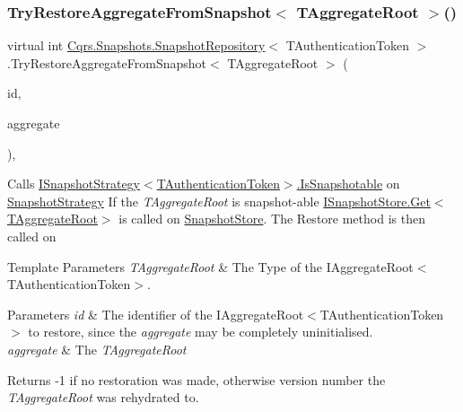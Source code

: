 \subsubsection{\texorpdfstring{Try\+Restore\+Aggregate\+From\+Snapshot$<$ T\+Aggregate\+Root $>$()}{TryRestoreAggregateFromSnapshot< TAggregateRoot >()}}
{\footnotesize\ttfamily virtual int \hyperlink{classCqrs_1_1Snapshots_1_1SnapshotRepository}{Cqrs.\+Snapshots.\+Snapshot\+Repository}$<$ T\+Authentication\+Token $>$.Try\+Restore\+Aggregate\+From\+Snapshot$<$ T\+Aggregate\+Root $>$ (\begin{DoxyParamCaption}\item[{Guid}]{id,  }\item[{T\+Aggregate\+Root}]{aggregate }\end{DoxyParamCaption})\hspace{0.3cm}{\ttfamily [protected]}, {\ttfamily [virtual]}}



Calls \hyperlink{interfaceCqrs_1_1Snapshots_1_1ISnapshotStrategy_a02121821312c4ce2811b31eeaffabe51_a02121821312c4ce2811b31eeaffabe51}{I\+Snapshot\+Strategy$<$\+T\+Authentication\+Token$>$.\+Is\+Snapshotable} on \hyperlink{classCqrs_1_1Snapshots_1_1SnapshotRepository_a7d65b4df10d0b6f75c911a9b6d59b3ba_a7d65b4df10d0b6f75c911a9b6d59b3ba}{Snapshot\+Strategy} If the {\itshape T\+Aggregate\+Root}  is snapshot-\/able \hyperlink{interfaceCqrs_1_1Snapshots_1_1ISnapshotStore_ab7bd163fc9cd5c3bd5911679030be403_ab7bd163fc9cd5c3bd5911679030be403}{I\+Snapshot\+Store.\+Get$<$\+T\+Aggregate\+Root$>$} is called on \hyperlink{classCqrs_1_1Snapshots_1_1SnapshotStore}{Snapshot\+Store}. The Restore method is then called on 


\begin{DoxyTemplParams}{Template Parameters}
{\em T\+Aggregate\+Root} & The Type of the I\+Aggregate\+Root$<$\+T\+Authentication\+Token$>$.\\
\hline
\end{DoxyTemplParams}

\begin{DoxyParams}{Parameters}
{\em id} & The identifier of the I\+Aggregate\+Root$<$\+T\+Authentication\+Token$>$ to restore, since the {\itshape aggregate}  may be completely uninitialised.\\
\hline
{\em aggregate} & The {\itshape T\+Aggregate\+Root} \\
\hline
\end{DoxyParams}
\begin{DoxyReturn}{Returns}
-\/1 if no restoration was made, otherwise version number the {\itshape T\+Aggregate\+Root}  was rehydrated to.
\end{DoxyReturn}


